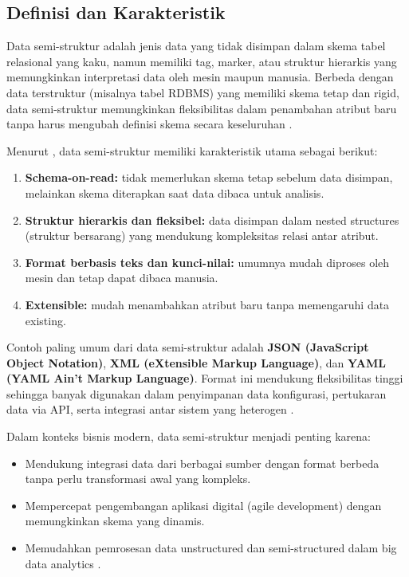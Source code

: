 \subsection{Definisi dan Karakteristik}

Data semi-struktur adalah jenis data yang tidak disimpan dalam skema tabel relasional yang kaku, namun memiliki tag, marker, atau struktur hierarkis yang memungkinkan interpretasi data oleh mesin maupun manusia. Berbeda dengan data terstruktur (misalnya tabel RDBMS) yang memiliki skema tetap dan rigid, data semi-struktur memungkinkan fleksibilitas dalam penambahan atribut baru tanpa harus mengubah definisi skema secara keseluruhan \cite{gandomi2015, moniruzzaman2013nosql}.

Menurut \cite{moniruzzaman2013nosql}, data semi-struktur memiliki karakteristik utama sebagai berikut:
\begin{enumerate}
	\item \textbf{Schema-on-read:} tidak memerlukan skema tetap sebelum data disimpan, melainkan skema diterapkan saat data dibaca untuk analisis.
	\item \textbf{Struktur hierarkis dan fleksibel:} data disimpan dalam nested structures (struktur bersarang) yang mendukung kompleksitas relasi antar atribut.
	\item \textbf{Format berbasis teks dan kunci-nilai:} umumnya mudah diproses oleh mesin dan tetap dapat dibaca manusia.
	\item \textbf{Extensible:} mudah menambahkan atribut baru tanpa memengaruhi data existing.
\end{enumerate}

Contoh paling umum dari data semi-struktur adalah \textbf{JSON (JavaScript Object Notation)}, \textbf{XML (eXtensible Markup Language)}, dan \textbf{YAML (YAML Ain't Markup Language)}. Format ini mendukung fleksibilitas tinggi sehingga banyak digunakan dalam penyimpanan data konfigurasi, pertukaran data via API, serta integrasi antar sistem yang heterogen \cite{han2011survey}.

Dalam konteks bisnis modern, data semi-struktur menjadi penting karena:
\begin{itemize}
	\item Mendukung integrasi data dari berbagai sumber dengan format berbeda tanpa perlu transformasi awal yang kompleks.
	\item Mempercepat pengembangan aplikasi digital (agile development) dengan memungkinkan skema yang dinamis.
	\item Memudahkan pemrosesan data unstructured dan semi-structured dalam big data analytics \cite{gandomi2015}.
\end{itemize}

